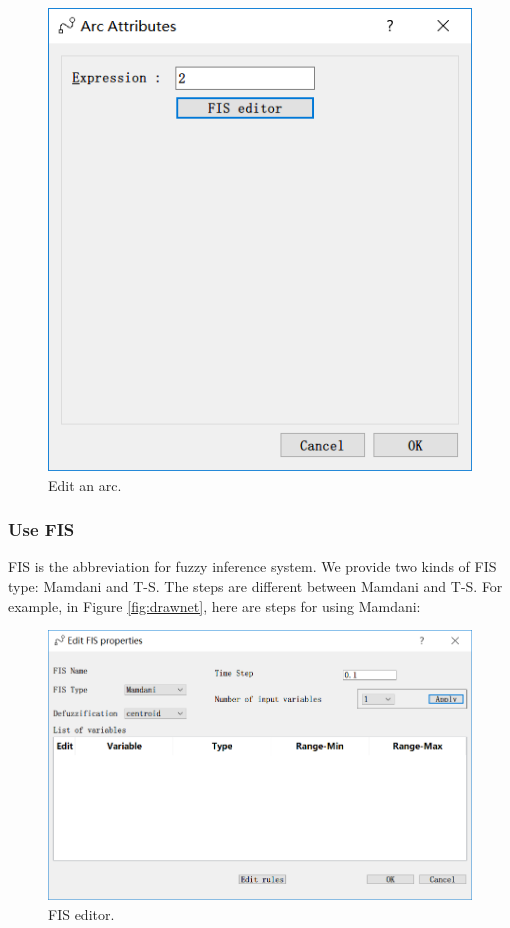 \documentclass[journal,a4paper,onecolumn]{article}
\begin{document}
\begin{figure}[!hbt]
	\begin{center}
		\includegraphics[width=\columnwidth]{fig5}
		\caption{Edit an arc.}
		\label{fig:editarc}
	\end{center}
\end{figure}

\subsubsection{Use FIS}
FIS is the abbreviation for fuzzy inference system. We provide two kinds of FIS type: Mamdani and T-S. The steps are different between Mamdani and T-S. For example, in Figure \ref{fig:drawnet}, here are steps for using Mamdani: 
 \begin{figure}[!hbt]
 	\begin{center}
 		\includegraphics[width=\columnwidth]{fig7}
 		\caption{FIS editor.}
 		\label{fig:FIS editor}
 	\end{center}
 \end{figure}
\end{document}
